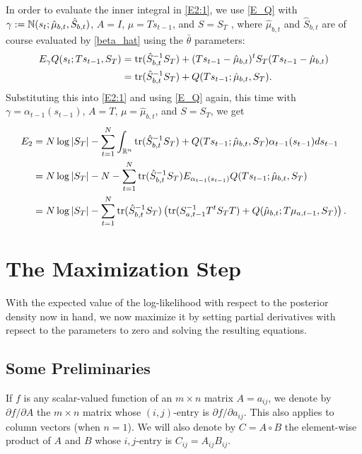 \documentclass[12pt,leqno]{article}
\begin{document}
In order to evaluate the inner integral in \eqref{E2:1}, we use \eqref{E_Q} 
with $\gamma := {\mathbb N}(s_t;\hat{\mu}_{b,t},\hat{S}_{b,t})$,  $A = I$,   $ \mu = Ts_{t-1}$, and
  $S = S_T$ , where $\hat{\mu}_{b,t}$ and $\hat{S}_{b,t}$ are of course  evaluated by \eqref{beta_hat} using the
  $\bar{\theta}$ parameters:
\begin{align*}
  E_{\gamma}Q(s_t;Ts_{t-1},S_T) &= \text{\rm tr}(\hat{S}_{b,t}^{-1}S_T) + (Ts_{t-1}-\hat{\mu}_{b,t})^tS_T(Ts_{t-1}-\hat{\mu}_{b,t})\\
  &= \text{\rm tr}(\hat{S}_{b,t}^{-1}S_T) + Q(Ts_{t-1};\hat{\mu}_{b,t},S_T).
  \end{align*}
  Substituting this into \eqref{E2:1} and using \eqref{E_Q} again, this time with $\gamma = \alpha_{t-1}(s_{t-1})$,  $A = T$,
  $\mu = \hat{\mu}_{b,t}$, and $S = S_T$, we get
\begin{equation}\label{E2:2}
  \begin{split}
    E_2 &= N\log|S_T| - \sum_{t=1}^N\int_{{\mathbb R}^n} \text{\rm tr}(\hat{S}_{b,t}^{-1}S_T) + Q(Ts_{t-1};\hat{\mu}_{b,t},S_T)\alpha_{t-1}(s_{t-1})ds_{t-1}\\
      &= N\log|S_T| - N - \sum_{t=1}^N\text{\rm tr}(\hat{S}_{b,t}^{-1}S_T)E_{\alpha_{t-1}(s_{t-1})}Q(Ts_{t-1};\hat{\mu}_{b,t},S_T) \\
      &= N\log|S_T|  - \sum_{t=1}^N\text{\rm tr}(\hat{S}_{b,t}^{-1}S_T)\left(\text{\rm tr}(S_{a,t-1}^{-1}T^tS_TT) + Q(\hat{\mu}_{b,t};T\mu_{a,t-1},S_T)\right).
  \end{split}
\end{equation}


\section{The Maximization Step} \label{maximization}
With the expected value of the log-likelihood with respect to the posterior density now in hand, we now maximize
it by setting partial derivatives with repsect to the parameters to zero and solving the resulting equations.

\subsection{Some Preliminaries}
If $f$ is any scalar-valued function of an $m\times{n}$ matrix $A = a_{ij}$, we denote by $\partial{f}/\partial{A}$ the 
$m\times{n}$ matrix whose $(i,j)$-entry is $\partial{f}/\partial{a_{ij}}$.  This also applies to column vectors
(when $n=1$). We will also denote by $C = A\circ{B}$ the element-wise product of $A$ and $B$ whose $i,j$-entry is
$C_{ij} = A_{ij}B_{ij}$.
\end{document}
